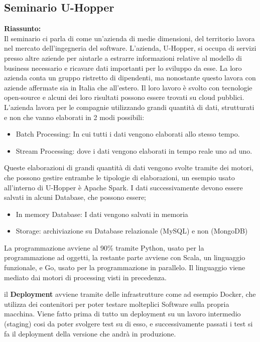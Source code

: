 \documentclass{article}
\begin{document}
\subsection{Seminario U-Hopper}
\textbf{Riassunto:}
\\ Il seminario ci parla di come un'azienda di medie dimensioni, del territorio lavora nel mercato dell'ingegneria del software. L'azienda, U-Hopper, si occupa di servizi presso altre aziende per aiutarle a estrarre informazioni relative al modello di business necessario e ricavare dati importanti per lo sviluppo da esse.
La loro azienda conta un gruppo ristretto di dipendenti, ma nonostante questo lavora con aziende affermate sia in Italia che all'estero.
Il loro lavoro è svolto con tecnologie open-source e alcuni dei loro risultati possono essere trovati su cloud pubblici.
L'azienda lavora per le compagnie utilizzando grandi quantità di dati, strutturati e non che vanno elaborati in 2 modi possibili:
\begin{itemize}
    \item Batch Processing: In cui tutti i dati vengono elaborati allo stesso tempo.
    \item Stream Processing: dove i dati vengono elaborati in tempo reale uno ad uno.
\end{itemize}
Queste elaborazioni di grandi quantità di dati vengono svolte tramite dei motori, che possono gestire entrambe le tipologie di elaborazioni, un esempio usato all'interno di U-Hopper è Apache Spark.
I dati successivamente devono essere salvati in alcuni Database, che possono essere;
\begin{itemize}
    \item In memory Database: I dati vengono salvati in memoria
    \item Storage: archiviazione su Database relazionale (MySQL) e non (MongoDB)
\end{itemize}

La programmazione avviene al 90\% tramite Python, usato per la programmazione ad oggetti, la restante parte avviene con Scala, un linguaggio funzionale, e Go, usato per la programmazione in parallelo. Il linguaggio  viene mediato dai motori di processing visti in precedenza.

il \textbf{Deployment} avviene tramite delle infrastrutture come ad esempio Docker, che utilizza dei contenitori per poter testare molteplici Software sulla propria macchina. Viene fatto prima di tutto un deployment su un lavoro intermedio (staging) cosi da poter svolgere test su di esso, e successivamente passati i test si fa il deployment della versione che andrà in produzione.
\end{document}
